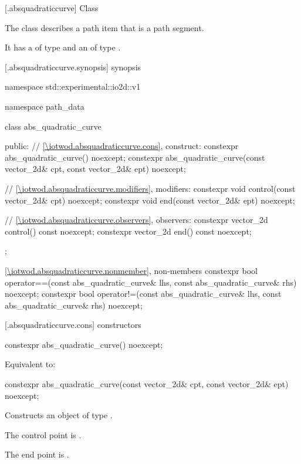  [\iotwod.absquadraticcurve] {Class }

\pnum
{}%
The class  describes a path item that is a path segment.

\pnum
It has a  of type  and an  of type .

 [\iotwod.absquadraticcurve.synopsis] { synopsis}

\begin{codeblock}
namespace std::experimental::io2d::v1 {
  namespace path_data {
    class abs_quadratic_curve {
    public:
      // \ref{\iotwod.absquadraticcurve.cons}, construct:
      constexpr abs_quadratic_curve() noexcept;
      constexpr abs_quadratic_curve(const vector_2d& cpt, const vector_2d& ept)
        noexcept;

      // \ref{\iotwod.absquadraticcurve.modifiers}, modifiers:
      constexpr void control(const vector_2d& cpt) noexcept;
      constexpr void end(const vector_2d& ept) noexcept;

      // \ref{\iotwod.absquadraticcurve.observers}, observers:
      constexpr vector_2d control() const noexcept;
      constexpr vector_2d end() const noexcept;
    };
    
    \ref{\iotwod.absquadraticcurve.nonmember}, non-members
    constexpr bool operator==(const abs_quadratic_curve& lhs,
      const abs_quadratic_curve& rhs) noexcept;
    constexpr bool operator!=(const abs_quadratic_curve& lhs,
      const abs_quadratic_curve& rhs) noexcept;
  }
}
\end{codeblock}

 [\iotwod.absquadraticcurve.cons] { constructors}

%
\begin{itemdecl}
constexpr abs_quadratic_curve() noexcept;
\end{itemdecl}
\begin{itemdescr}
\pnum
\effects
Equivalent to: 
\end{itemdescr}

%
\begin{itemdecl}
constexpr abs_quadratic_curve(const vector_2d& cpt, const vector_2d& ept)
  noexcept;
\end{itemdecl}
\begin{itemdescr}
\pnum
\effects
Constructs an object of type .

\pnum
The control point is .

\pnum
The end point is .
\end{itemdescr}

